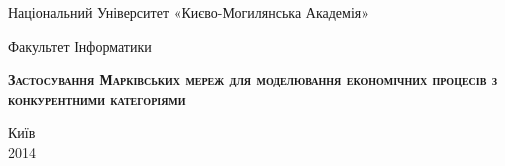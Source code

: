 \begin{titlepage}
\newpage

\begin{center}
Національний Університет «Києво-Могилянська Академія» \\
\end{center}

\vspace{8em}

\begin{center}
\Large Факультет Інформатики \\ 
\end{center}

\vspace{2em}

\begin{center}
\textsc{\textbf{Застосування Марківських мереж для моделювання економічних процесів з конкурентними категоріями}}
\end{center}

\vspace{6em}

\vspace{\fill}

\begin{center}
Київ \\2014
\end{center}

\end{titlepage}
